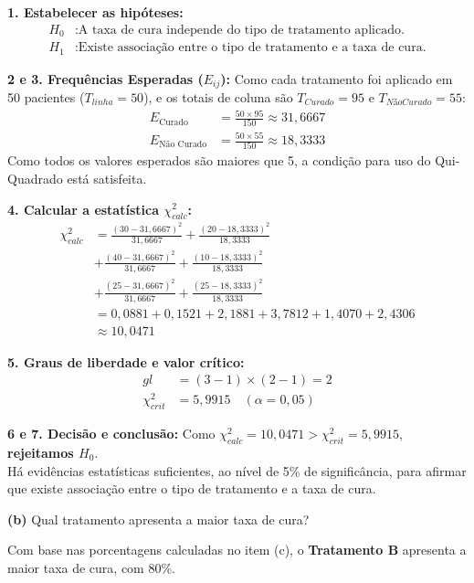 \documentclass[12pt, a4paper]{article}
\begin{document}
\noindent \textbf{1. Estabelecer as hipóteses:}
\begin{align*}
H_0 &: \text{A taxa de cura independe do tipo de tratamento aplicado.} \\
H_1 &: \text{Existe associação entre o tipo de tratamento e a taxa de cura.}
\end{align*}

\noindent \textbf{2 e 3. Frequências Esperadas ($E_{ij}$):}
Como cada tratamento foi aplicado em 50 pacientes ($T_{linha} = 50$), e os totais de coluna são $T_{Curado} = 95$ e $T_{NãoCurado} = 55$:
\begin{align*}
E_{\text{Curado}} &= \frac{50 \times 95}{150} \approx 31{,}6667 \\
E_{\text{Não Curado}} &= \frac{50 \times 55}{150} \approx 18{,}3333
\end{align*}
Como todos os valores esperados são maiores que 5, a condição para uso do Qui-Quadrado está satisfeita.

\noindent \textbf{4. Calcular a estatística $\chi^2_{calc}$:}
\begin{align*}
\chi^2_{calc} &= \frac{(30-31{,}6667)^2}{31{,}6667} + \frac{(20-18{,}3333)^2}{18{,}3333} \\
&+ \frac{(40-31{,}6667)^2}{31{,}6667} + \frac{(10-18{,}3333)^2}{18{,}3333} \\
&+ \frac{(25-31{,}6667)^2}{31{,}6667} + \frac{(25-18{,}3333)^2}{18{,}3333} \\
&= 0{,}0881 + 0{,}1521 + 2{,}1881 + 3{,}7812 + 1{,}4070 + 2{,}4306 \\
&\approx \boxed{10{,}0471}
\end{align*}

\noindent \textbf{5. Graus de liberdade e valor crítico:}
\begin{align*}
gl &= (3-1) \times (2-1) = \boxed{2} \\
\chi^2_{crit} &= \boxed{5{,}9915} \quad (\alpha = 0{,}05)
\end{align*}

\noindent \textbf{6 e 7. Decisão e conclusão:}
Como $\chi^2_{calc} = 10{,}0471 > \chi^2_{crit} = 5{,}9915$, \textbf{rejeitamos $H_0$}. \\
Há evidências estatísticas suficientes, ao nível de 5\% de significância, para afirmar que existe associação entre o tipo de tratamento e a taxa de cura.

\medskip\noindent\textbf{(b)} Qual tratamento apresenta a maior taxa de cura?

\noindent Com base nas porcentagens calculadas no item (c), o \textbf{Tratamento B} apresenta a maior taxa de cura, com 80\%.
\end{document}
